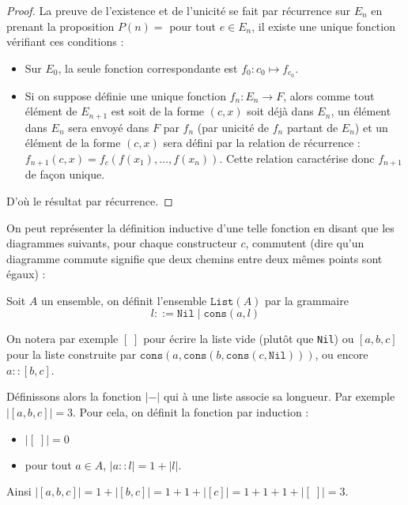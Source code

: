 \begin{proof}
    La preuve de l'existence et de l'unicité se fait par récurrence sur $E_n$ en prenant la proposition $P(n) =$ pour tout $e\in E_n$, il existe une unique fonction vérifiant ces conditions :
    \begin{itemize}[label=$\bullet$]
        \item Sur $E_0$, la seule fonction correspondante est $f_0 : c_0 \mapsto f_{c_0}$.
        \item Si on suppose définie une unique fonction $f_n : E_n \to F$, alors comme tout élément de $E_{n+1}$ est soit de la forme $(c,x)$ soit déjà dans $E_n$, un élément dans $E_n$ sera envoyé dans $F$ par $f_n$ (par unicité de $f_n$ partant de $E_n$) et un élément de la forme $(c,x)$ sera défini par la relation de récurrence : $f_{n+1}(c,x) = f_c(f(x_1),\ldots,f(x_n))$. Cette relation caractérise donc $f_{n+1}$ de façon unique.
    \end{itemize}
    D'où le résultat par récurrence.
\end{proof}

On peut représenter la définition inductive d'une telle fonction en disant que les diagrammes suivants, pour chaque constructeur $c$, commutent (dire qu'un diagramme commute signifie que deux chemins entre deux mêmes points sont égaux) :

\begin{center}
\end{center}

\begin{expl}[Liste]
    Soit $A$ un ensemble, on définit l'ensemble $\texttt{List}(A)$ par la grammaire $$ l::= \texttt{Nil}\mid \texttt{cons}(a,l)$$

    On notera par exemple $[\;]$ pour écrire la liste vide (plutôt que \texttt{Nil}) ou $[a,b,c]$ pour la liste construite par $\texttt{cons}(a,\texttt{cons}(b,\texttt{cons}(c,\texttt{Nil})))$, ou encore $a::[b,c]$.

    Définissons alors la fonction $|-|$ qui à une liste associe sa longueur. Par exemple $|[a,b,c]| = 3$. Pour cela, on définit la fonction par induction :
    \begin{itemize}[label=$\bullet$]
        \item $|[\;]| = 0$
        \item pour tout $a\in A$, $|a::l| = 1+|l|$.
    \end{itemize}

    Ainsi $|[a,b,c]| = 1 + |[b,c]| = 1 + 1 + |[c]| = 1 + 1 + 1 + |[\;]| = 3$.
\end{expl}

